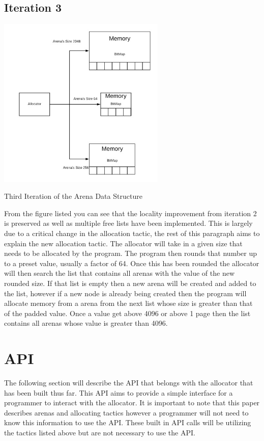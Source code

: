 \documentclass[conference]{IEEEtran}
\begin{document}
\subsection{Iteration 3}
\includegraphics[width=8cm]{Iteration3datastructure.jpg}
\caption{Third Iteration of the Arena Data Structure}
\label{fig3:Iteration3}
From the figure listed you can see that the locality improvement from iteration 2 is preserved as well as multiple free lists have been implemented. This is largely due to a critical change in the allocation tactic, the rest of this paragraph aims to explain the new allocation tactic. The allocator will take in a given size that needs to be allocated by the program. The program then rounds that number up to a preset value, usually a factor of 64. Once this has been rounded the allocator will then search the list that contains all arenas with the value of the new rounded size. If that list is empty then a new arena will be created and added to the list, however if a new node is already being created then the program will allocate memory from a arena from the next list whose size is greater than that of the padded value. Once a value get above 4096 or above 1 page then the list contains all arenas whose value is greater than 4096. 


\section{API}
The following section will describe the API that belongs with the allocator that has been built thus far. This API aims to provide a simple interface for a programmer to interact with the allocator. It is important to note that this paper describes arenas and allocating tactics however a programmer will not need to know this information to use the API. These built in API calls will be utilizing the tactics listed above but are not necessary to use the API. 
\end{document}
